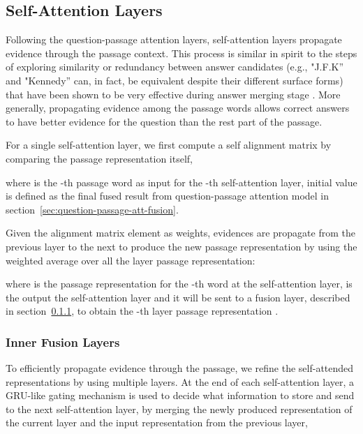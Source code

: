 \documentclass{article} \usepackage{arxiv, times}
\begin{document}
\subsection{Self-Attention Layers} \label{sec:self-att-layers}
Following the question-passage attention layers, self-attention layers propagate evidence through the passage context.
This process is similar in spirit to the steps of exploring similarity or redundancy between answer candidates (e.g., "J.F.K'' and "Kennedy'' can, in fact, be equivalent despite their different surface forms) that have been shown to be very effective during answer merging stage \citep{ferrucci2010building}. More generally, propagating evidence among the passage words allows correct answers to have better evidence for the question than the rest part of the passage.

For a single self-attention layer, we first compute a self alignment matrix  by comparing the passage representation itself,

where  is the -th passage word as input for the -th self-attention layer, initial value  is defined as the final fused result  from question-passage attention model in section~\ref{sec:question-passage-att-fusion}. 




Given the alignment matrix element as weights, evidences are propagate from the previous layer to the next to produce the new passage representation  by using the weighted average over all the  layer passage representation: 

where  is the passage representation for the -th word at the  self-attention layer,  is the output the self-attention layer and it will be sent to a fusion layer, described in section~\ref{subsection:self-att-fusion}, to obtain the -th layer passage representation .




\subsubsection{Inner Fusion Layers}\label{subsection:self-att-fusion}
To efficiently propagate evidence through the passage, we refine the self-attended representations by using multiple layers. 
At the end of each self-attention layer, a GRU-like gating mechanism \citep{hureinforced} is used to decide what information to store and send to the next self-attention layer, by merging the newly produced representation of the current layer and the input representation from the previous layer,
\end{document}
